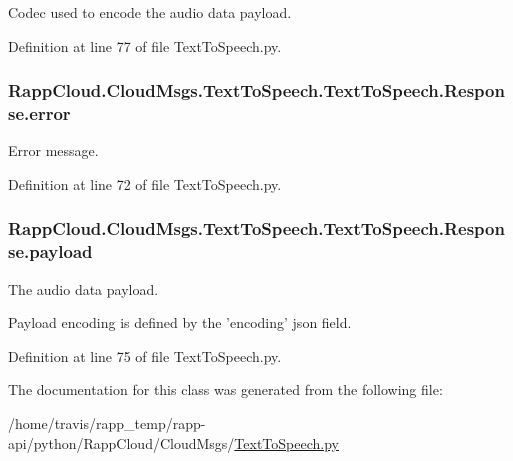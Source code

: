 Codec used to encode the audio data payload. 



Definition at line 77 of file Text\-To\-Speech.\-py.

\hypertarget{classRappCloud_1_1CloudMsgs_1_1TextToSpeech_1_1TextToSpeech_1_1Response_a18ca271f996e2f5393a05f6496fbaaf5}{
\subsubsection[{error}]{\setlength{\rightskip}{0pt plus 5cm}Rapp\-Cloud.\-Cloud\-Msgs.\-Text\-To\-Speech.\-Text\-To\-Speech.\-Response.\-error}}\label{classRappCloud_1_1CloudMsgs_1_1TextToSpeech_1_1TextToSpeech_1_1Response_a18ca271f996e2f5393a05f6496fbaaf5}


Error message. 



Definition at line 72 of file Text\-To\-Speech.\-py.

\hypertarget{classRappCloud_1_1CloudMsgs_1_1TextToSpeech_1_1TextToSpeech_1_1Response_aeda29307874af91698814140144d1149}{
\subsubsection[{payload}]{\setlength{\rightskip}{0pt plus 5cm}Rapp\-Cloud.\-Cloud\-Msgs.\-Text\-To\-Speech.\-Text\-To\-Speech.\-Response.\-payload}}\label{classRappCloud_1_1CloudMsgs_1_1TextToSpeech_1_1TextToSpeech_1_1Response_aeda29307874af91698814140144d1149}


The audio data payload. 

Payload encoding is defined by the 'encoding' json field. 

Definition at line 75 of file Text\-To\-Speech.\-py.



The documentation for this class was generated from the following file\-:\begin{DoxyCompactItemize}
\item 
/home/travis/rapp\-\_\-temp/rapp-\/api/python/\-Rapp\-Cloud/\-Cloud\-Msgs/\hyperlink{TextToSpeech_8py}{Text\-To\-Speech.\-py}\end{DoxyCompactItemize}
